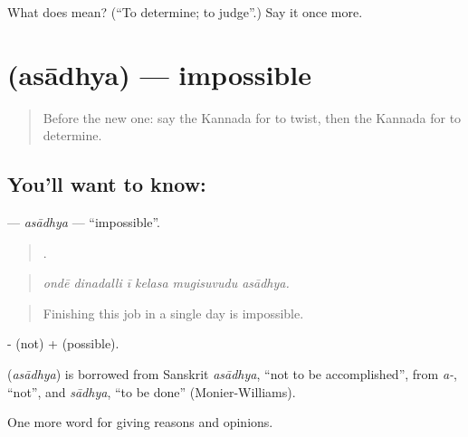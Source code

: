 \begin{tcolorbox}[breakable,colback=teal!4,colframe=teal!35!black,title={Before you move on}]
What does  mean? (\textquotedblleft{}To determine; to judge\textquotedblright{}.) Say it once more.
\end{tcolorbox}
\section[\texorpdfstring{\kn{ಅಸಾಧ್ಯ} (asādhya)}{ಅಸಾಧ್ಯ (asādhya)}]{ (asādhya) — impossible}

\label{lesson:KA-C383-asadhya}



\begin{quote}
Before the new one: say the Kannada for to twist, then the Kannada for to determine.
\end{quote}

\subsection*{You'll want to know: }
\textbf{} — \emph{asādhya} — \textquotedblleft{}impossible\textquotedblright{}.

\begin{quote}
     .
\end{quote}

\begin{quote}
\emph{ondē dinadalli ī kelasa mugisuvudu asādhya.}
\end{quote}

\begin{quote}
Finishing this job in a single day is impossible.
\end{quote}

- (not) +  (possible).

\begin{cousinweb}
\textbf{} (\emph{asādhya}) is borrowed from Sanskrit \emph{asādhya}, \textquotedblleft{}not to be accomplished\textquotedblright{}, from \emph{a-}, \textquotedblleft{}not\textquotedblright{}, and \emph{sādhya}, \textquotedblleft{}to be done\textquotedblright{} (Monier-Williams).
\end{cousinweb}

\begin{grammarlens}[title={What you've built}]
One more word for giving reasons and opinions.
\end{grammarlens}

